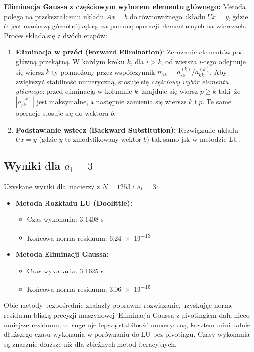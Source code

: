 \documentclass[a4paper, 11pt]{article}
\begin{document}
\textbf{Eliminacja Gaussa z częściowym wyborem elementu głównego:} Metoda polega na przekształceniu układu $Ax=b$ do równoważnego układu $Ux=y$, gdzie $U$ jest macierzą górnotrójkątną, za pomocą operacji elementarnych na wierszach. Proces składa się z dwóch etapów:
\begin{enumerate}
    \item \textbf{Eliminacja w przód (Forward Elimination):} Zerowanie elementów pod główną przekątną. W każdym kroku $k$, dla $i > k$, od wiersza $i$-tego odejmuje się wiersz $k$-ty pomnożony przez współczynnik $m_{ik} = a_{ik}^{(k)} / a_{kk}^{(k)}$. Aby zwiększyć stabilność numeryczną, stosuje się \textit{częściowy wybór elementu głównego}: przed eliminacją w kolumnie $k$, znajduje się wiersz $p \ge k$ taki, że $|a_{pk}^{(k)}|$ jest maksymalne, a następnie zamienia się wiersze $k$ i $p$. Te same operacje stosuje się do wektora $b$.
    \item \textbf{Podstawianie wstecz (Backward Substitution):} Rozwiązanie układu $Ux=y$ (gdzie $y$ to zmodyfikowany wektor $b$) tak samo jak w metodzie LU.
\end{enumerate}

\subsection{Wyniki dla $a_1=3$}
Uzyskane wyniki dla macierzy z $N=1253$ i $a_1=3$:
\begin{itemize}
    \item \textbf{Metoda Rozkładu LU (Doolittle):}
    \begin{itemize}
        \item Czas wykonania: \num{3.1408} s
        \item Końcowa norma residuum: \num{6.24e-13}
    \end{itemize}
    \item \textbf{Metoda Eliminacji Gaussa:}
    \begin{itemize}
        \item Czas wykonania: \num{3.1625} s
        \item Końcowa norma residuum: \num{3.06e-15}
    \end{itemize}
\end{itemize}
Obie metody bezpośrednie znalazły poprawne rozwiązanie, uzyskując normę residuum bliską precyzji maszynowej. Eliminacja Gaussa z pivotingiem dała nieco mniejsze residuum, co sugeruje lepszą stabilność numeryczną, kosztem minimalnie dłuższego czasu wykonania w porównaniu do LU bez pivotingu. Czasy wykonania są znacznie dłuższe niż dla zbieżnych metod iteracyjnych.
\end{document}
